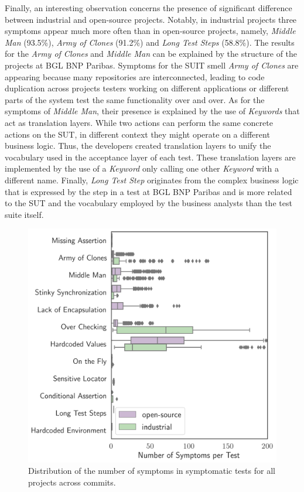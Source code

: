 Finally, an interesting observation concerns the presence of significant difference between industrial and open-source projects. Notably, in industrial projects three symptoms appear much more often than in open-source projects, namely, \emph{Middle Man} (93.5\%), \emph{Army of Clones} (91.2\%) and \emph{Long Test Steps} (58.8\%). The results for the \emph{Army of Clones} and \emph{Middle Man} can be explained by the structure of the projects at BGL BNP Paribas. Symptoms for the SUIT smell \emph{Army of Clones} are appearing because many repositories are interconnected, leading to code duplication across projects testers working on different applications or different parts of the system test the same functionality over and over. As for the symptoms of \emph{Middle Man}, their presence is explained by the use of \emph{Keywords} that act as translation layers. While two actions can perform the same concrete actions on the SUT, in different context they might operate on a different business logic. Thus, the developers created translation layers to unify the vocabulary used in the acceptance layer of each test. These translation layers are implemented by the use of a \emph{Keyword} only calling one other \emph{Keyword} with a different name. Finally, \emph{Long Test Step} originates from the complex business logic that is expressed by the step in a test at BGL BNP Paribas and is more related to the SUT and the vocabulary employed by the business analysts than the test suite itself.

\begin{figure}
\centering
\includegraphics[width=0.9\linewidth]{figures/smells/smell-raw-value-200-distribution-boxplot.png}
\caption{Distribution of the number of symptoms in symptomatic tests for all projects across commits.}  
\label{fig:raw-smells-distribution}
\end{figure}


